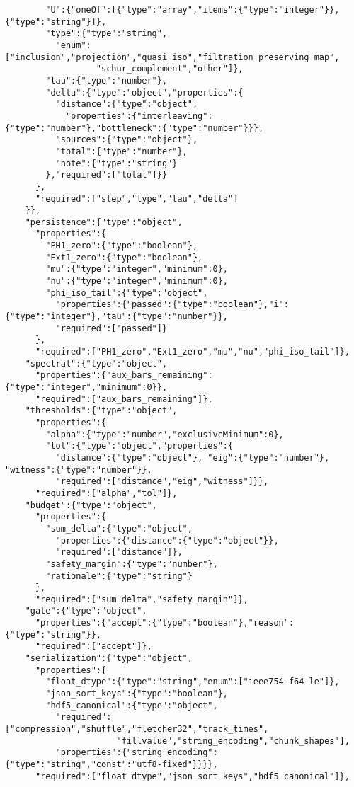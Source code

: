 \documentclass[11pt]{article}
\numberwithin{equation}{section}
\theoremstyle{definition}
\begin{document}
\begin{verbatim}
        "U":{"oneOf":[{"type":"array","items":{"type":"integer"}},{"type":"string"}]},
        "type":{"type":"string",
          "enum":["inclusion","projection","quasi_iso","filtration_preserving_map",
                  "schur_complement","other"]},
        "tau":{"type":"number"},
        "delta":{"type":"object","properties":{
          "distance":{"type":"object",
            "properties":{"interleaving":{"type":"number"},"bottleneck":{"type":"number"}}},
          "sources":{"type":"object"},
          "total":{"type":"number"},
          "note":{"type":"string"}
        },"required":["total"]}}
      },
      "required":["step","type","tau","delta"]
    }},
    "persistence":{"type":"object",
      "properties":{
        "PH1_zero":{"type":"boolean"},
        "Ext1_zero":{"type":"boolean"},
        "mu":{"type":"integer","minimum":0},
        "nu":{"type":"integer","minimum":0},
        "phi_iso_tail":{"type":"object",
          "properties":{"passed":{"type":"boolean"},"i":{"type":"integer"},"tau":{"type":"number"}},
          "required":["passed"]}
      },
      "required":["PH1_zero","Ext1_zero","mu","nu","phi_iso_tail"]},
    "spectral":{"type":"object",
      "properties":{"aux_bars_remaining":{"type":"integer","minimum":0}},
      "required":["aux_bars_remaining"]},
    "thresholds":{"type":"object",
      "properties":{
        "alpha":{"type":"number","exclusiveMinimum":0},
        "tol":{"type":"object","properties":{
          "distance":{"type":"object"}, "eig":{"type":"number"}, "witness":{"type":"number"}},
          "required":["distance","eig","witness"]}},
      "required":["alpha","tol"]},
    "budget":{"type":"object",
      "properties":{
        "sum_delta":{"type":"object",
          "properties":{"distance":{"type":"object"}},
          "required":["distance"]},
        "safety_margin":{"type":"number"},
        "rationale":{"type":"string"}
      },
      "required":["sum_delta","safety_margin"]},
    "gate":{"type":"object",
      "properties":{"accept":{"type":"boolean"},"reason":{"type":"string"}},
      "required":["accept"]},
    "serialization":{"type":"object",
      "properties":{
        "float_dtype":{"type":"string","enum":["ieee754-f64-le"]},
        "json_sort_keys":{"type":"boolean"},
        "hdf5_canonical":{"type":"object",
          "required":["compression","shuffle","fletcher32","track_times",
                      "fillvalue","string_encoding","chunk_shapes"],
          "properties":{"string_encoding":{"type":"string","const":"utf8-fixed"}}}},
      "required":["float_dtype","json_sort_keys","hdf5_canonical"]},

\end{verbatim}
\end{document}
